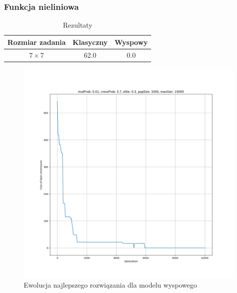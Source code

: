 \documentclass{beamer}
\begin{document}
\begin{frame}
    \frametitle{Funkcja nieliniowa}
     {
        \begin{table}
            \begin{center}
                \begin{tabular}{c||c|c}
                    Rozmiar zadania & Klasyczny & Wyspowy \\ 
                    \hline
                    $7\times7$ & 62.0 & 0.0 \\
                \end{tabular}
            \end{center}
            \caption{Rezultaty}
        \end{table}
    }
    
     {
        \begin{figure}[ht]
            \centering
            \includegraphics[scale=0.2]{resultPlot_island.png}
            \caption{Ewolucja najlepszego rozwiązania dla modelu wyspowego}
        \end{figure}
    }


\end{frame}
\end{document}
